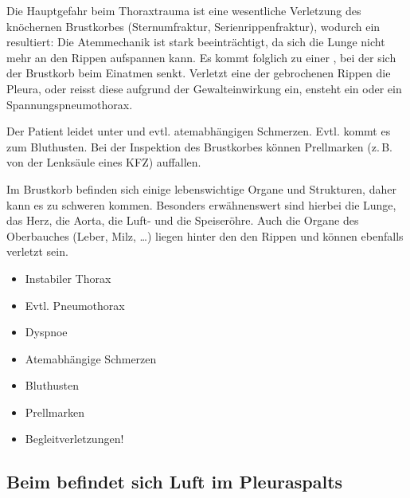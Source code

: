 {
Die Hauptgefahr beim Thoraxtrauma ist eine wesentliche
Verletzung des knöchernen Brustkorbes (Sternumfraktur,
Serienrippenfraktur), wodurch ein 
resultiert: Die Atemmechanik ist stark beeinträchtigt, da
sich die Lunge nicht mehr an den Rippen aufspannen
kann. Es kommt folglich zu einer , bei der sich der Brustkorb
beim Einatmen
senkt.
Verletzt eine der gebrochenen Rippen die Pleura, oder reisst
diese aufgrund der Gewalteinwirkung ein, ensteht ein
 oder ein
Spannungspneumothorax.

Der Patient leidet unter  und evtl.
atemabhängigen Schmerzen. Evtl. kommt es zum Bluthusten. Bei
der Inspektion des Brustkorbes können Prellmarken (z.\,B.
von der Lenksäule eines KFZ) auffallen.

Im Brustkorb befinden sich einige lebenswichtige Organe und
Strukturen, daher kann es zu schweren
 kommen.
Besonders erwähnenswert sind hierbei die Lunge, das Herz,
die Aorta, die Luft- und die Speiseröhre. Auch die Organe
des Oberbauches (Leber, Milz, \ldots) liegen hinter den den
Rippen und können ebenfalls verletzt sein.
}{%
\begin{itemize}
  \item Instabiler Thorax
  \item Evtl. Pneumothorax
  \item Dyspnoe
  \item Atemabhängige Schmerzen
  \item Bluthusten
  \item Prellmarken
  \item Begleitverletzungen!
\end{itemize}
}{}{}{}



\subsection{Beim  befindet sich 
Luft im Pleuraspalts}
\label{topic:pneumothorax}%
%
%
%
%
%
%
%

